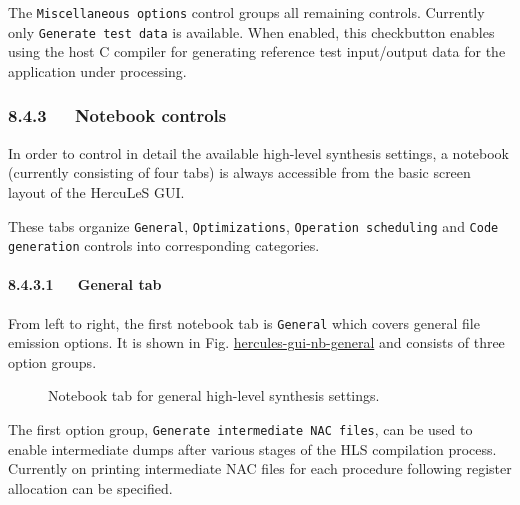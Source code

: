 \documentclass[a4paper]{article}
\begin{document}
The \texttt{Miscellaneous options} control groups all remaining controls. Currently only \texttt{Generate test data} is available. When enabled, this checkbutton enables using the host C compiler for generating reference test input/output data for the application under processing.


\subsubsection{8.4.3~~~Notebook controls%
  \label{notebook-controls}%
}

In order to control in detail the available high-level synthesis settings, a notebook (currently consisting of four tabs) is always accessible from the basic screen layout of the HercuLeS GUI.

These tabs organize \texttt{General}, \texttt{Optimizations}, \texttt{Operation scheduling} and \texttt{Code generation} controls into corresponding categories.


\paragraph{8.4.3.1~~~General tab%
  \label{general-tab}%
}

From left to right, the first notebook tab is \texttt{General} which covers general file emission options. It is shown in Fig. \hyperref[hercules-gui-nb-general]{hercules-gui-nb-general} and consists of three option groups.
\begin{figure}
\label{hercules-gui-nb-general}
\noindent{}
\caption{Notebook tab for general high-level synthesis settings.}
\end{figure}

The first option group, \texttt{Generate intermediate NAC files}, can be used to enable intermediate dumps after various stages of the HLS compilation process. Currently on printing intermediate NAC files for each procedure following register allocation can be specified.
\end{document}
